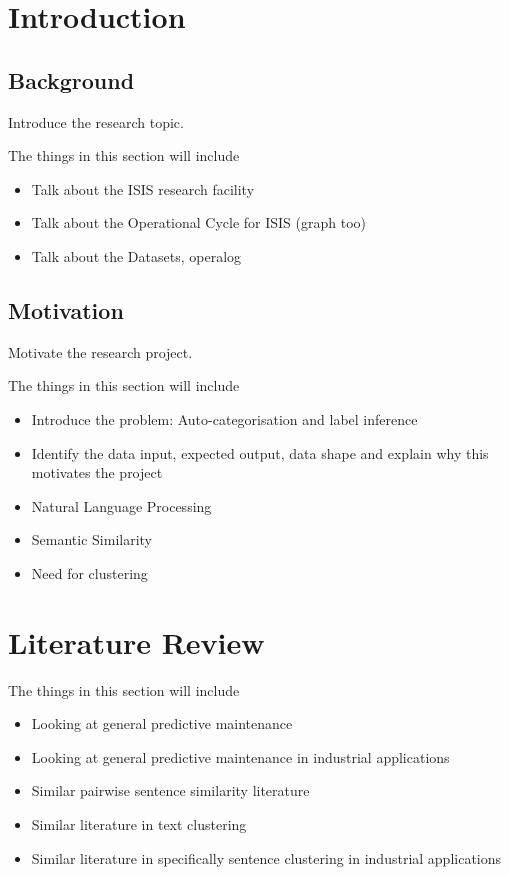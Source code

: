 \documentclass[10pt,oneside]{report}
\begin{document}
\clearpage


\chapter{Introduction}
\section{Background}
Introduce the research topic. 

The things in this section will include
\begin{itemize}
    \item Talk about the ISIS research facility
    \item Talk about the Operational Cycle for ISIS (graph too)
    \item Talk about the Datasets, operalog
\end{itemize}

\section{Motivation}
Motivate the research project.


The things in this section will include
\begin{itemize}
    \item Introduce the problem: Auto-categorisation and label inference
    \item Identify the data input, expected output, data shape and explain why this motivates the project
    \item Natural Language Processing
    \item Semantic Similarity
    \item Need for clustering
\end{itemize}

\chapter{Literature Review}

The things in this section will include
\begin{itemize}
    \item Looking at general predictive maintenance 
    \item Looking at general predictive maintenance in industrial applications
    \item Similar pairwise sentence similarity literature
    \item Similar literature in text clustering
    \item Similar literature in specifically sentence clustering in industrial applications
\end{itemize}
\end{document}
